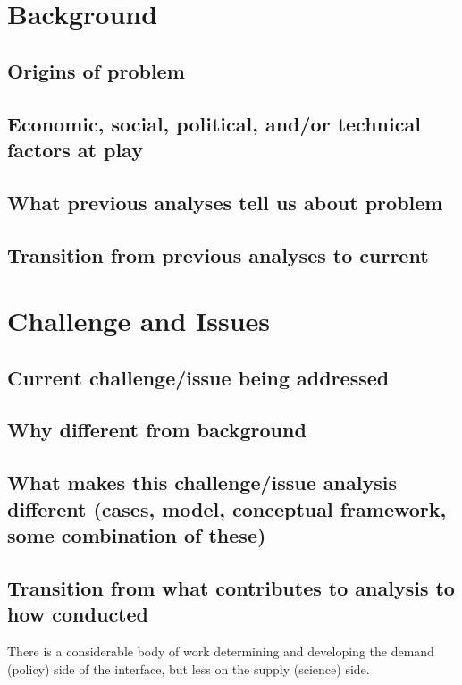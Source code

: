 \section{Background}

\subsection{Origins of problem}

\subsection{Economic, social, political, and/or technical factors at play}

\subsection{What previous analyses tell us about problem}

\subsection{Transition from previous analyses to current}


\section{Challenge and Issues}

\subsection{Current challenge/issue being addressed}

\subsection{Why different from background}

\subsection{What makes this challenge/issue analysis different (cases, model, conceptual framework, some combination of these)}

\subsection{Transition from what contributes to analysis to how conducted}


There is a considerable body of work determining and developing the demand (policy) side of the interface, but less on the supply (science) side.

